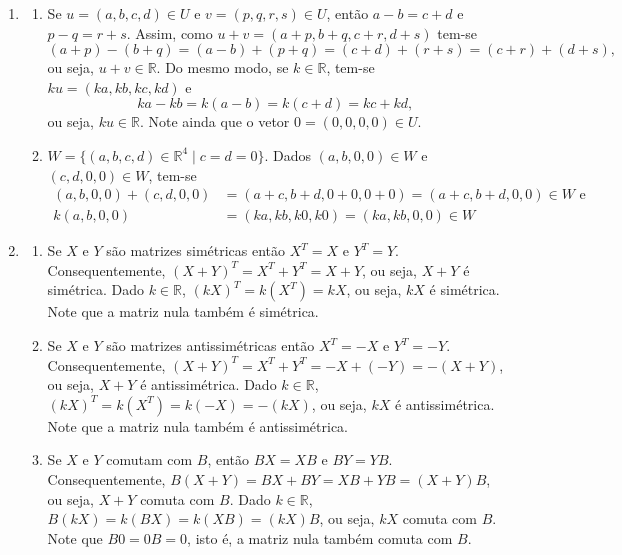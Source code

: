 \documentclass[12pt,a4paper]{article}
\newcommand*\R{\mathbb{R}}
\begin{document}
\begin{enumerate}
\item 
\begin{enumerate}
\item Se $u = (a,b,c,d) \in U$ e $v = (p,q,r,s) \in U$, então $a-b = c+d$ e $p-q = r+s$. Assim, como $u + v = (a+p,b+q,c+r,d+s)$ tem-se
\[
(a+p) - (b+q)
= (a-b) + (p+q)
= (c+d) + (r+s)
= (c+r) + (d+s),
\]
ou seja, $u + v \in \R$. Do mesmo modo, se $k \in \R$, tem-se $k u = (ka, kb, kc, kd)$ e
\[
ka - kb
= k(a-b)
= k(c+d)
= kc+kd,
\]
ou seja, $ku \in \R$. Note ainda que o vetor $0 = (0,0,0,0) \in U$.
\item $W = \{ (a,b,c,d) \in \R^4 \mid c = d = 0 \}$.
Dados $(a,b,0,0) \in W$ e $(c,d,0,0) \in W$, tem-se
\begin{align*}
(a,b,0,0) + (c,d,0,0)
& = (a+c,b+d,0+0,0+0)
  = (a+c,b+d,0,0)
\in W \text{ e} \\
 k( a,  b, 0, 0)
& = (ka, kb, k0, k0)
  = (ka, kb, 0, 0)
\in W
\end{align*}
\end{enumerate}
\item 
\begin{enumerate}
\item Se $X$ e $Y$ são matrizes simétricas então $X^T = X$ e $Y^T = Y$. Consequentemente, $(X+Y)^T = X^T+Y^T = X + Y$, ou seja, $X+Y$ é simétrica. Dado $k \in \R$, $(kX)^T = k(X^T) = kX$, ou seja, $kX$ é simétrica. Note que a matriz nula também é simétrica.

\item Se $X$ e $Y$ são matrizes antissimétricas então $X^T = -X$ e $Y^T = -Y$. Consequentemente, $(X+Y)^T = X^T+Y^T = -X + (-Y) = -(X+Y)$, ou seja, $X+Y$ é antissimétrica. Dado $k \in \R$, $(kX)^T = k(X^T) = k(-X) = -(kX)$, ou seja, $kX$ é antissimétrica. Note que a matriz nula também é antissimétrica.
\item Se $X$ e $Y$ comutam com $B$, então $BX = XB$ e $BY = YB$. Consequentemente, $B(X+Y) = BX+BY = XB + YB = (X+Y)B$, ou seja, $X+Y$ comuta com $B$. Dado $k \in \R$, $B(kX) = k(BX) = k(XB) = (kX)B$, ou seja, $kX$ comuta com $B$. Note que $B0 = 0B = 0$, isto é, a matriz nula também comuta com $B$.


\end{enumerate}
\end{enumerate}
\end{document}
